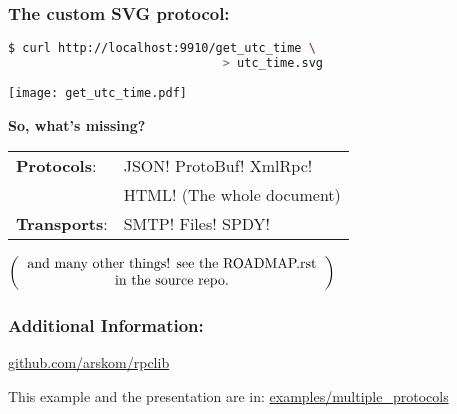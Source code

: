 \documentclass{beamer}
\begin{document}
\begin{frame}[fragile]
\frametitle{The custom SVG protocol:}

  \begin{lstlisting}[language=sh]
$ curl http://localhost:9910/get_utc_time \
                              > utc_time.svg
  \end{lstlisting}

  \begin{center}
    \texttt{[image: get\_utc\_time.pdf]}
  \end{center}
\end{frame}

\begin{frame}
  \huge
  \textbf{So, what's missing?}
  \begin{center}
\Large
  \begin{tabular}{ll}
    \textbf{Protocols}:  & JSON! ProtoBuf! XmlRpc! \\
                         & HTML! (The whole document) \\
    \textbf{Transports}: & SMTP! Files! SPDY!
  \end{tabular}

  \bigskip

  \large
  $\left(
    \begin{tabular}{c}
    and many other things! see the ROADMAP.rst \\
    in the source repo.
  \end{tabular}
  \right)$

  \end{center}
\end{frame}

\begin{frame}
  \frametitle{Additional Information:}

  \begin{center}
  \huge

  \href{http://github.com/arskom/rpclib}{github.com/arskom/rpclib}

  \bigskip

  \large

  This example and the presentation are in:
  \href{https://github.com/arskom/rpclib/tree/master/examples/multiple_protocols}{examples/multiple\_protocols}

  \bigskip

  \huge

  \end{center}

\end{frame}
\end{document}
